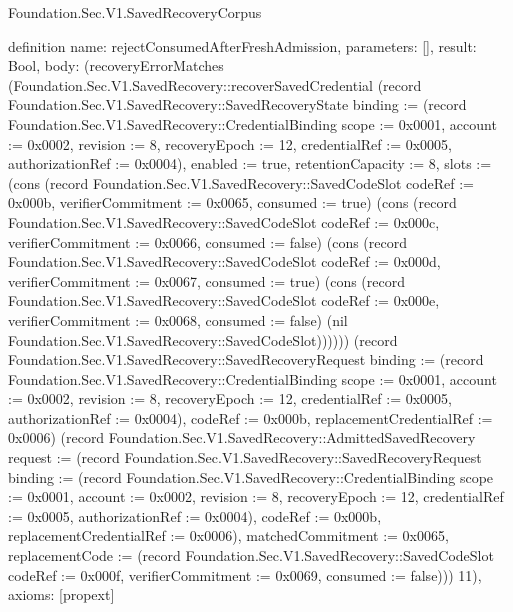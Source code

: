 \begin{lexlean}{Foundation.Sec.V1.SavedRecoveryCorpus}
\begin{semanticmodule}
definition{
  name: rejectConsumedAfterFreshAdmission,
  parameters: [],
  result: Bool,
  body: (recoveryErrorMatches (Foundation.Sec.V1.SavedRecovery::recoverSavedCredential (record Foundation.Sec.V1.SavedRecovery::SavedRecoveryState {binding := (record Foundation.Sec.V1.SavedRecovery::CredentialBinding {scope := 0x0001, account := 0x0002, revision := 8, recoveryEpoch := 12, credentialRef := 0x0005, authorizationRef := 0x0004}), enabled := true, retentionCapacity := 8, slots := (cons (record Foundation.Sec.V1.SavedRecovery::SavedCodeSlot {codeRef := 0x000b, verifierCommitment := 0x0065, consumed := true}) (cons (record Foundation.Sec.V1.SavedRecovery::SavedCodeSlot {codeRef := 0x000c, verifierCommitment := 0x0066, consumed := false}) (cons (record Foundation.Sec.V1.SavedRecovery::SavedCodeSlot {codeRef := 0x000d, verifierCommitment := 0x0067, consumed := true}) (cons (record Foundation.Sec.V1.SavedRecovery::SavedCodeSlot {codeRef := 0x000e, verifierCommitment := 0x0068, consumed := false}) (nil Foundation.Sec.V1.SavedRecovery::SavedCodeSlot)))))}) (record Foundation.Sec.V1.SavedRecovery::SavedRecoveryRequest {binding := (record Foundation.Sec.V1.SavedRecovery::CredentialBinding {scope := 0x0001, account := 0x0002, revision := 8, recoveryEpoch := 12, credentialRef := 0x0005, authorizationRef := 0x0004}), codeRef := 0x000b, replacementCredentialRef := 0x0006}) (record Foundation.Sec.V1.SavedRecovery::AdmittedSavedRecovery {request := (record Foundation.Sec.V1.SavedRecovery::SavedRecoveryRequest {binding := (record Foundation.Sec.V1.SavedRecovery::CredentialBinding {scope := 0x0001, account := 0x0002, revision := 8, recoveryEpoch := 12, credentialRef := 0x0005, authorizationRef := 0x0004}), codeRef := 0x000b, replacementCredentialRef := 0x0006}), matchedCommitment := 0x0065, replacementCode := (record Foundation.Sec.V1.SavedRecovery::SavedCodeSlot {codeRef := 0x000f, verifierCommitment := 0x0069, consumed := false})})) 11),
  axioms: [propext]
}


\end{semanticmodule}
\end{lexlean}
